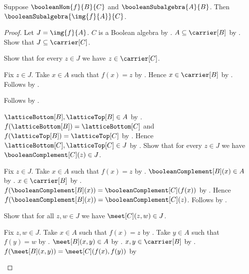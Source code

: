 \begin{theorem}\label{boolean_hom_subalgebra_image}
    Suppose $\booleanHom{f}{B}{C}$ and
        $\booleanSubalgebra{A}{B}$.
    Then $\booleanSubalgebra{\img{f}{A}}{C}$.
\end{theorem}
\begin{proof}
    Let $J=\img{f}{A}$.
    $C$ is a Boolean algebra by
        .
    $A\subseteq\carrier[B]$ by .
    Show that $J\subseteq\carrier[C]$.
    \begin{subproof}
        Show that for every $z\in J$ we have $z\in\carrier[C]$.
        \begin{subproof}
            Fix $z\in J$.
            Take $x\in A$ such that $f(x)=z$ by
                .
            Hence $x\in\carrier[B]$ by .
            Follows by .
        \end{subproof}
        Follows by .
    \end{subproof}
    $\latticeBottom[B],\latticeTop[B]\in A$ by
        .
    $f(\latticeBottom[B])=\latticeBottom[C]$ and
        $f(\latticeTop[B])=\latticeTop[C]$ by
        .
    Hence $\latticeBottom[C],\latticeTop[C]\in J$ by
        .
    Show that for every $z\in J$ we have
        $\booleanComplement[C](z)\in J$.
    \begin{subproof}
        Fix $z\in J$.
        Take $x\in A$ such that $f(x)=z$ by
            .
        $\booleanComplement[B](x)\in A$ by
            .
        $x\in\carrier[B]$ by .
        $f(\booleanComplement[B](x))
            =\booleanComplement[C](f(x))$ by
            .
        Hence $f(\booleanComplement[B](x))
            =\booleanComplement[C](z)$.
        Follows by .
    \end{subproof}
    Show that for all $z,w\in J$ we have $\meet[C](z,w)\in J$.
    \begin{subproof}
        Fix $z,w\in J$.
        Take $x\in A$ such that $f(x)=z$ by
            .
        Take $y\in A$ such that $f(y)=w$ by
            .
        $\meet[B](x,y)\in A$ by .
        $x,y\in\carrier[B]$ by .
        $f(\meet[B](x,y))=\meet[C](f(x),f(y))$ by

\end{subproof}
\end{proof}
